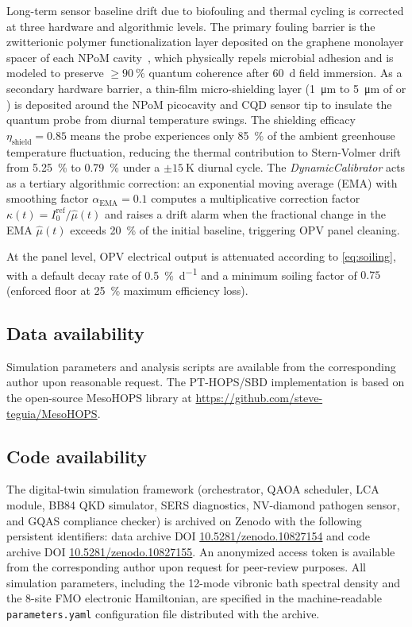 \documentclass[onecolumn,a4paper,12pt]{article}
\begin{document}
Long-term sensor baseline drift due to biofouling and thermal cycling is corrected at three hardware and algorithmic levels. The primary fouling barrier is the zwitterionic polymer functionalization layer deposited on the graphene monolayer spacer of each NPoM cavity~\cite{Kumar2022,Do2025}, which physically repels microbial adhesion and is modeled to preserve $\geq\qty{90}{\percent}$ quantum coherence after \qty{60}{\day} field immersion. As a secondary hardware barrier, a thin-film micro-shielding layer (\qty{1}{\micro\meter} to \qty{5}{\micro\meter} of  or ) is deposited around the NPoM picocavity and CQD sensor tip to insulate the quantum probe from diurnal temperature swings. The shielding efficacy $\eta_{\mathrm{shield}} = 0.85$ means the probe experiences only \qty{85}{\percent} of the ambient greenhouse temperature fluctuation, reducing the thermal contribution to Stern-Volmer drift from \qty{5.25}{\percent} to \qty{0.79}{\percent} under a $\pm\qty{15}{\K}$ diurnal cycle. The \textit{DynamicCalibrator} acts as a tertiary algorithmic correction: an exponential moving average (EMA) with smoothing factor $\alpha_{\mathrm{EMA}} = 0.1$ computes a multiplicative correction factor $\kappa(t) = I_0^{\mathrm{ref}} / \hat{\mu}(t)$ and raises a drift alarm when the fractional change in the EMA $\hat{\mu}(t)$ exceeds \qty{20}{\percent} of the initial baseline, triggering OPV panel cleaning.

At the panel level, OPV electrical output is attenuated according to \cref{eq:soiling}, with a default decay rate of \qty{0.5}{\percent\per\day} and a minimum soiling factor of $0.75$ (enforced floor at \qty{25}{\percent} maximum efficiency loss).

\subsection*{Data availability}

Simulation parameters and analysis scripts are available from the corresponding author upon reasonable request.
The PT-HOPS/SBD implementation is based on the open-source MesoHOPS library at \url{https://github.com/steve-teguia/MesoHOPS}.

\subsection*{Code availability}
The digital-twin simulation framework (orchestrator, QAOA scheduler, LCA module, BB84 QKD simulator, SERS diagnostics, NV-diamond pathogen sensor, and GQAS compliance checker) is archived on Zenodo with the following persistent identifiers: data archive DOI \href{https://doi.org/10.5281/zenodo.10827154}{10.5281/zenodo.10827154} and code archive DOI \href{https://doi.org/10.5281/zenodo.10827155}{10.5281/zenodo.10827155}. An anonymized access token is available from the corresponding author upon request for peer-review purposes. All simulation parameters, including the 12-mode vibronic bath spectral density and the 8-site FMO electronic Hamiltonian, are specified in the machine-readable \texttt{parameters.yaml} configuration file distributed with the archive.
\end{document}
